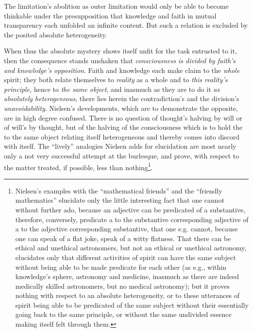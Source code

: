 \documentclass[12pt,a4paper]{book}
\begin{document}
The limitation's abolition as outer limitation would only be able to become thinkable under the presupposition
that knowledge and faith in mutual transparency each unfolded an infinite content. But such a relation is
excluded by the posited absolute heterogeneity.

When thus the absolute mystery shows itself unfit for the task entrusted to it, then the consequence stands
unshaken that \emph{consciousness is divided by faith's and knowledge's opposition}. Faith and knowledge each
make claim to the \emph{whole} spirit; they both relate themselves to \emph{reality} as a whole and to \emph{this
reality's principle}, hence to \emph{the same object}, and inasmuch as they are to do it \emph{as absolutely
heterogeneous}, there lies herein the contradiction's and the division's \emph{unavoidability}. Nielsen's
developments, which are to demonstrate the opposite, are in high degree confused. There is no question of
thought's halving by will or of will's by thought, but of the halving of the consciousness which is to hold the
to the same object relating itself heterogeneous and thereby comes into discord with itself. The ``lively''
analogies Nielsen adds for elucidation are most nearly only a not very successful attempt at the burlesque, and
prove, with respect to the matter treated, if possible, less than nothing\footnote{Nielsen's examples with the
``mathematical friends'' and the ``friendly mathematics'' elucidate only the little interesting fact that one
cannot without further ado, because an adjective can be predicated of a substantive, therefore, conversely,
predicate a to the substantive corresponding adjective of a to the adjective corresponding substantive, that one
e.g. cannot, because one can speak of a flat joke, speak of a witty flatness. That there can be ethical and
unethical astronomers, but not an ethical or unethical astronomy, elucidates only that different activities of
spirit can have the same subject without being able to be made predicate for each other (as e.g., within
knowledge's sphere, astronomy and medicine, inasmuch as there are indeed medically skilled astronomers, but no
medical astronomy); but it proves nothing with respect to an absolute heterogeneity, or to these utterances of
spirit being able to be predicated of the same subject without their essentially going back to the same principle,
or without the same undivided essence making itself felt through them.}.
\end{document}

